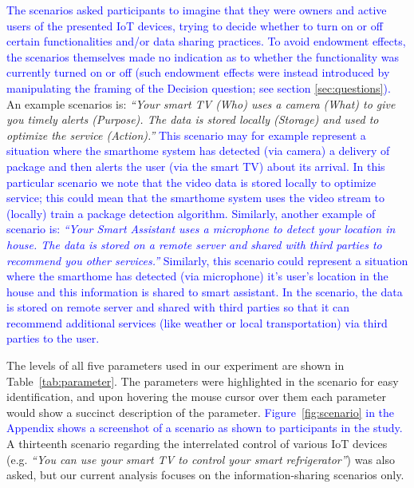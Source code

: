 \textcolor{blue}{The scenarios asked participants to imagine that they were owners and active users of the presented IoT devices, trying to decide whether to turn on or off certain functionalities and/or data sharing practices. To avoid endowment effects, the scenarios themselves made no indication as to whether the functionality was currently turned on or off (such endowment effects were instead introduced by manipulating the framing of the Decision question; see section \ref{sec:questions}).} An example scenarios is: \emph{``Your smart TV (Who) uses a camera (What) to give you timely alerts (Purpose). The data is stored locally (Storage) and used to optimize the service (Action).''} \textcolor{blue}{This scenario may for example represent a situation where the smarthome system has detected (via camera) a delivery of package and then alerts the user (via the smart TV) about its arrival. In this particular scenario we note that the video data is stored locally to optimize service; this could mean that the smarthome system uses the video stream to (locally) train a package detection algorithm. Similarly, another example of scenario is: \emph{``Your Smart Assistant uses a microphone to detect your location in house. The data is stored on a remote server and shared with third parties to recommend you other services.''} Similarly, this scenario could represent a situation where the smarthome has detected (via microphone) it's user's location in the house and this information is shared to smart assistant. In the scenario, the data is stored on remote server and shared with third parties so that it can recommend additional services (like weather or local transportation) via third parties to the user.} 

The levels of all five parameters used in our experiment are shown in Table~\ref{tab:parameter}. The parameters were highlighted in the scenario for easy identification, and upon hovering the mouse cursor over them each parameter would show a succinct description of the parameter. \textcolor{blue}{Figure~\ref{fig:scenario} in the Appendix shows a screenshot of a scenario as shown to participants in the study.} A thirteenth scenario regarding the interrelated control of various IoT devices (e.g. \emph{``You can use your smart TV to control your smart refrigerator''}) was also asked, but our current analysis focuses on the information-sharing scenarios only.

